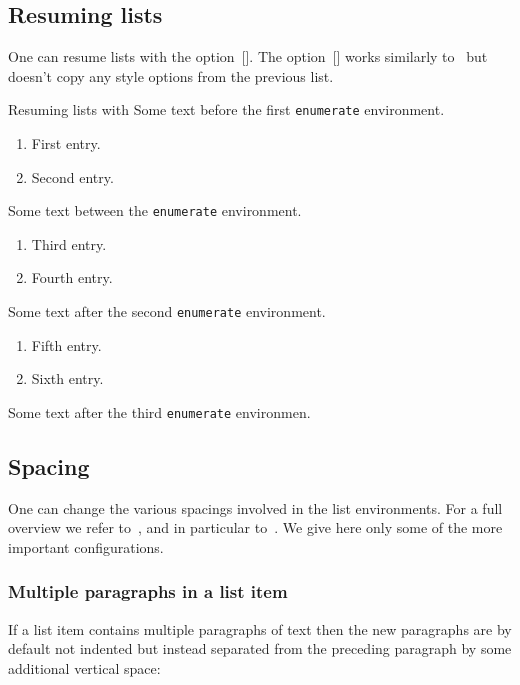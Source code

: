 \subsection{Resuming lists}    

One can resume lists with the option~[\optname].
The option~[\optname] works similarly to~ but doesn’t copy any style options from the previous list.
\begin{showlatex}{Resuming lists with }
Some text before the first \texttt{enumerate} environment.
\begin{enumerate}[label = \roman*.]
  \item
    First entry.
  \item
    Second entry.
\end{enumerate}
Some text between the \texttt{enumerate} environment.
\begin{enumerate}[resume*]
  \item
    Third entry.
  \item
    Fourth entry.
\end{enumerate}
Some text after the second \texttt{enumerate} environment.
\begin{enumerate}[resume]
  \item
    Fifth entry.
  \item
    Sixth entry.
\end{enumerate}
Some text after the third \texttt{enumerate} environmen.
\end{showlatex}



\subsection{Spacing}

One can change the various spacings involved in the list environments.
For a full overview we refer to~\cite{enumitem}, and in particular to~\cite[Figure~1]{enumitem}.
We give here only some of the more important configurations.

\subsubsection{Multiple paragraphs in a list item}

If a list item contains multiple paragraphs of text then the new paragraphs are by default not indented but instead separated from the preceding paragraph by some additional vertical space:

